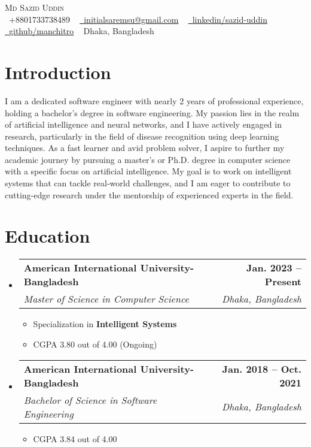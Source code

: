\documentclass[letterpaper,11pt]{article}
\makeatletter
\newcommand{\resumeItem}[1]{
  \item\small{
    {#1 \vspace{-2pt}}
  }
}
\newcommand{\resumeSubheading}[4]{
  \vspace{-2pt}\item
    \begin{tabular*}{1.0\textwidth}[t]{l@{\extracolsep{\fill}}r}
      \textbf{#1} & \textbf{\small #2} \\
      \textit{\small#3} & \textit{\small #4} \\
    \end{tabular*}\vspace{-7pt}
}
\newcommand{\resumeSubHeadingListStart}{\begin{itemize}[leftmargin=0.0in, label={}]}
\newcommand{\resumeSubHeadingListEnd}{\end{itemize}}
\newcommand{\resumeItemListStart}{\begin{itemize}}
\newcommand{\resumeItemListEnd}{\end{itemize}\vspace{-5pt}}
\makeatother
\begin{document}

\begin{center}
	{\Huge \scshape Md Sazid Uddin} \\ \vspace{5pt}
	\small \raisebox{-0.1\height}\faPhone\ +8801733738489 ~
	\href{mailto:initialsaremsu@gmail.com}{\raisebox{-0.2\height}\faEnvelope\  \underline{initialsaremsu@gmail.com}} ~
	\href{https://www.linkedin.com/in/sazid-uddin/}{\raisebox{-0.2\height}\faLinkedin\ \underline{linkedin/sazid-uddin}}  ~
	\href{https://github.com/manchitro}{\raisebox{-0.2\height}\faGithub\ \underline{github/manchitro}}  ~
	\small {} Dhaka, Bangladesh
	\vspace{-8pt}
\end{center}

\section{Introduction}
\justifying
I am a dedicated software engineer with nearly 2 years of professional experience, holding a bachelor's degree in software engineering. My passion lies in the realm of artificial intelligence and neural networks, and I have actively engaged in research, particularly in the field of disease recognition using deep learning techniques. As a fast learner and avid problem solver, I aspire to further my academic journey by pursuing a master's or Ph.D. degree in computer science with a specific focus on artificial intelligence. My goal is to work on intelligent systems that can tackle real-world challenges, and I am eager to contribute to cutting-edge research under the mentorship of experienced experts in the field.


\section{Education}
\resumeSubHeadingListStart
\resumeSubheading
{American International University-Bangladesh}{Jan. 2023 -- Present}
{Master of Science in Computer Science}{Dhaka, Bangladesh}
\resumeItemListStart
\resumeItem{Specialization in \textbf{Intelligent Systems}}
\resumeItem{CGPA 3.80 out of 4.00 (Ongoing)}
\resumeItemListEnd
\resumeSubheading
{American International University-Bangladesh}{Jan. 2018 -- Oct. 2021}
{Bachelor of Science in Software Engineering}{Dhaka, Bangladesh}
\resumeItemListStart
\resumeItem{CGPA 3.84 out of 4.00}
\resumeItemListEnd
\resumeSubHeadingListEnd
\vspace{-18pt}
\end{document}
